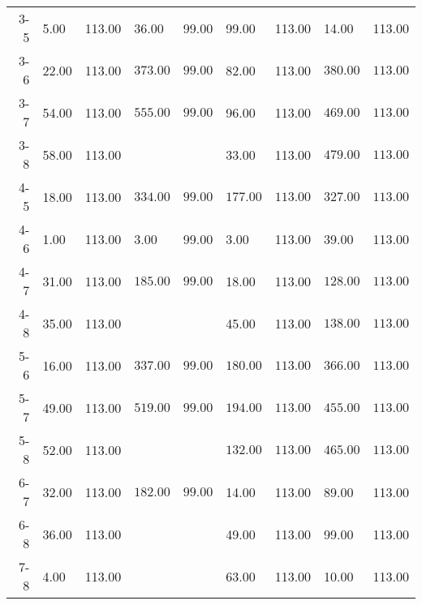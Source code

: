 \begin{table}[ht]
\begin{tabular}{rllllllll}
  3-5 & 5.00 & 113.00 & 36.00 & 99.00 & 99.00 & 113.00 & 14.00 & 113.00 \\ 
  3-6 & 22.00 & 113.00 & \(\mathbf{373.00}\) & \(\mathbf{99.00}\) & 82.00 & 113.00 & \(\mathbf{380.00}\) & \(\mathbf{113.00}\) \\ 
  3-7 & 54.00 & 113.00 & \(\mathbf{555.00}\) & \(\mathbf{99.00}\) & 96.00 & 113.00 & \(\mathbf{469.00}\) & \(\mathbf{113.00}\) \\ 
  3-8 & 58.00 & 113.00 &  &  & 33.00 & 113.00 & \(\mathbf{479.00}\) & \(\mathbf{113.00}\) \\ 
  4-5 & 18.00 & 113.00 & \(\mathbf{334.00}\) & \(\mathbf{99.00}\) & \(\mathbf{177.00}\) & \(\mathbf{113.00}\) & \(\mathbf{327.00}\) & \(\mathbf{113.00}\) \\ 
  4-6 & 1.00 & 113.00 & 3.00 & 99.00 & 3.00 & 113.00 & 39.00 & 113.00 \\ 
  4-7 & 31.00 & 113.00 & \(\mathbf{185.00}\) & \(\mathbf{99.00}\) & 18.00 & 113.00 & \(\mathbf{128.00}\) & \(\mathbf{113.00}\) \\ 
  4-8 & 35.00 & 113.00 &  &  & 45.00 & 113.00 & \(\mathbf{138.00}\) & \(\mathbf{113.00}\) \\ 
  5-6 & 16.00 & 113.00 & \(\mathbf{337.00}\) & \(\mathbf{99.00}\) & \(\mathbf{180.00}\) & \(\mathbf{113.00}\) & \(\mathbf{366.00}\) & \(\mathbf{113.00}\) \\ 
  5-7 & 49.00 & 113.00 & \(\mathbf{519.00}\) & \(\mathbf{99.00}\) & \(\mathbf{194.00}\) & \(\mathbf{113.00}\) & \(\mathbf{455.00}\) & \(\mathbf{113.00}\) \\ 
  5-8 & 52.00 & 113.00 &  &  & \(\mathbf{132.00}\) & \(\mathbf{113.00}\) & \(\mathbf{465.00}\) & \(\mathbf{113.00}\) \\ 
  6-7 & 32.00 & 113.00 & \(\mathbf{182.00}\) & \(\mathbf{99.00}\) & 14.00 & 113.00 & 89.00 & 113.00 \\ 
  6-8 & 36.00 & 113.00 &  &  & 49.00 & 113.00 & 99.00 & 113.00 \\ 
  7-8 & 4.00 & 113.00 &  &  & 63.00 & 113.00 & 10.00 & 113.00 \\ 
   \bottomrule
\end{tabular}
\end{table}
